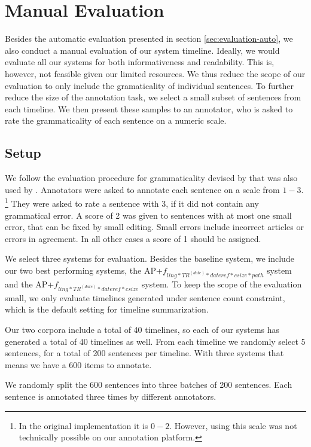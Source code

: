 \documentclass[a4paper,BCOR=10mm]{report}
\numberwithin{lemma}{chapter}
\numberwithin{definition}{chapter}
\begin{document}
\chapter{Manual Evaluation}

Besides the automatic evaluation presented in section \ref{sec:evaluation-auto}, we also conduct a manual evaluation of our system timeline.
Ideally, we would evaluate all our systems for both informativeness and readability. This is, however, not feasible given our limited resources.
We thus reduce the scope of our evaluation to only include the gramaticality of individual sentences.
To further reduce the size of the annotation task, we select a small subset of sentences from each timeline.
We then present these samples to an annotator, who is asked to rate the grammaticality of each sentence on a numeric scale.

\section{Setup}

We follow the evaluation procedure for grammaticality devised by \citet{mckeown} that was also used by \citet{filippova}.
Annotators were asked to annotate each sentence on a scale from $1-3$. \footnote{In the original implementation it is $0-2$. However, using this scale was not technically possible on our annotation platform.} They were asked to rate a sentence with 3, if it did not contain any grammatical error. A score of 2 was given to sentences with at most one small error, that can be fixed by small editing. Small errors include incorrect articles or errors in agreement. In all other cases a score of 1 should be assigned.

We select three systems for evaluation. Besides the baseline system, we include our two best performing systems, the AP+$f_{ ling*TR^{(date)}*\mathit{dateref}*\mathit{csize}*\mathit{path} }$ system and the AP+$f_{ ling*TR^{(date)}*\mathit{dateref}*\mathit{csize} }$ system.
To keep the scope of the evaluation small, we only evaluate timelines generated under sentence count constraint, which is the default setting for timeline summarization.

Our two corpora include a total of 40 timelines, so each of our systems has generated a total of 40 timelines as well.
From each timeline we randomly select 5 sentences, for a total of 200 sentences per timeline.
With three systems that means we have a 600 items to annotate.

We randomly split the 600 sentences into three batches of 200 sentences. Each sentence is annotated three times by different annotators.
\end{document}

